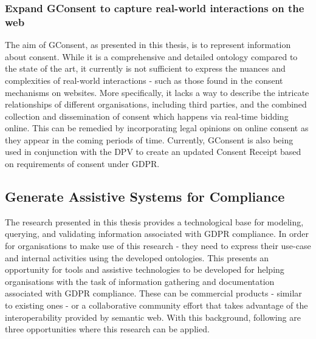 
\subsubsection*{Expand GConsent to capture real-world interactions on the web}
The aim of GConsent, as presented in this thesis, is to represent information about consent. While it is a comprehensive and detailed ontology compared to the state of the art, it currently is not sufficient to express the nuances and complexities of real-world interactions - such as those found in the consent mechanisms on websites. More specifically, it lacks a way to describe the intricate relationships of different organisations, including third parties, and the combined collection and dissemination of consent which happens via real-time bidding online. This can be remedied by incorporating legal opinions on online consent as they appear in the coming periods of time.
Currently, GConsent is also being used in conjunction with the DPV to create an updated Consent Receipt \cite{lizar_consent_2017} based on requirements of consent under GDPR.

\subsection*{Generate Assistive Systems for Compliance}
The research presented in this thesis provides a technological base for modeling, querying, and validating information associated with GDPR compliance. In order for organisations to make use of this research - they need to express their use-case and internal activities using the developed ontologies. This presents an opportunity for tools and assistive technologies to be developed for helping organisations with the task of information gathering and documentation associated with GDPR compliance. These can be commercial products - similar to existing ones - or a collaborative community effort that takes advantage of the interoperability provided by semantic web. With this background, following are three opportunities where this research can be applied.

